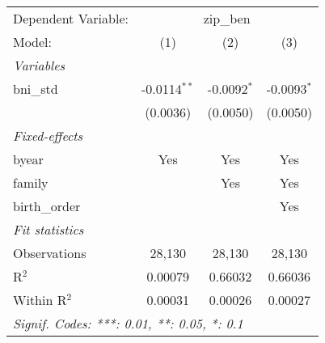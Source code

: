 

\begin{tabular}{lccc}
\tabularnewline\midrule\midrule
Dependent Variable: & \multicolumn{3}{c}{zip\_ben}\\
Model: & (1) & (2) & (3)\\
\midrule \emph{Variables} &   &   &  \\
bni\_std & -0.0114$^{**}$ & -0.0092$^{*}$ & -0.0093$^{*}$\\
  & (0.0036) & (0.0050) & (0.0050)\\
\midrule \emph{Fixed-effects} &   &   &  \\
byear & Yes & Yes & Yes\\
family &  & Yes & Yes\\
birth\_order &  &  & Yes\\
\midrule \emph{Fit statistics} &   &   &  \\
Observations & 28,130 & 28,130 & 28,130\\
R$^2$ & 0.00079 & 0.66032 & 0.66036\\
Within R$^2$ & 0.00031 & 0.00026 & 0.00027\\
\midrule\midrule\multicolumn{4}{l}{\emph{Signif. Codes: ***: 0.01, **: 0.05, *: 0.1}}\\
\end{tabular}


